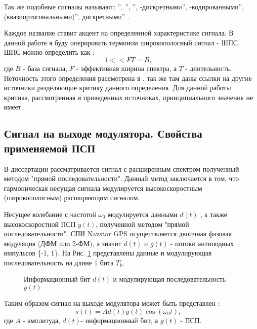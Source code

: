 Так же подобные сигналы называют:
\textquotedblright,
\textquotedblright,
\textquotedblright,
-дискретными\textquotedblright,
-кодированными\textquotedblright,
 (квазиортогональными)\textquotedblright,
 дискретными\textquotedblright
\cite{gantmaher-book}.

Каждое название ставит акцент на определенной характеристике сигнала. В данной работе я буду оперировать термином
широкополосный сигнал - ШПС. ШПС можно определить как \cite{gantmaher-book, varakin-book}:
\begin{equation}
	\label{eq:ss_signal}
	1 << FT = B,
\end{equation}
где ${B}$ - база сигнала, ${F}$ - эффективная ширина спектра, а ${T}$ - длительность.
Неточность этого определения рассмотрена в \cite{gantmaher-book}, так же там даны ссылки на другие источники
разделяющие критику данного определения. Для данной работы критика, рассмотренная в приведенных источниках,
принципиального значения не имеет.

\subsection{Сигнал на выходе модулятора. Свойства применяемой ПСП}
В диссертации рассматривается сигнал с расширенным спектром полученный методом "прямой последовательности".
Данный метод заключается в том, что гармоническая несущая сигнала модулируется высокоскоростным (широкополосным)
расширяющим сигналом. 

Несущее колебание с частотой ${\omega_0}$  модулируется данными ${d(t)}$ , а также высокоскоростной ПСП ${g(t)}$, полученной методом "прямой последовательности".
СПИ Navstar GPS осуществляется двоичная фазовая модуляция (ДФМ или 2-ФМ), а значит ${d(t)}$  и ${g(t)}$  - потоки антиподных импульсов \{-1, 1\}. На Рис. 
\ref{pic:bit_and_code} представлены данные и модулирующая последовательность на длине 1 бита ${T_b}$.
\begin{figure}[h]
	\center{}
	\caption{Информационный бит ${d(t)}$ и модулирующая последовательность ${g(t)}$ } 
	\label{pic:bit_and_code}
\end{figure}

Таким образом сигнал на выходе модулятора может быть представлен \cite{shahtarin_sync}:
\begin{equation}
	\label{eq:cdma_eq}
	s(t)=Ad(t)g(t)\cos{(\omega_{0}t)},
\end{equation}
где ${A}$ - амплитуда, ${d(t)}$- информационный бит, а ${g(t)}$ - ПСП.

